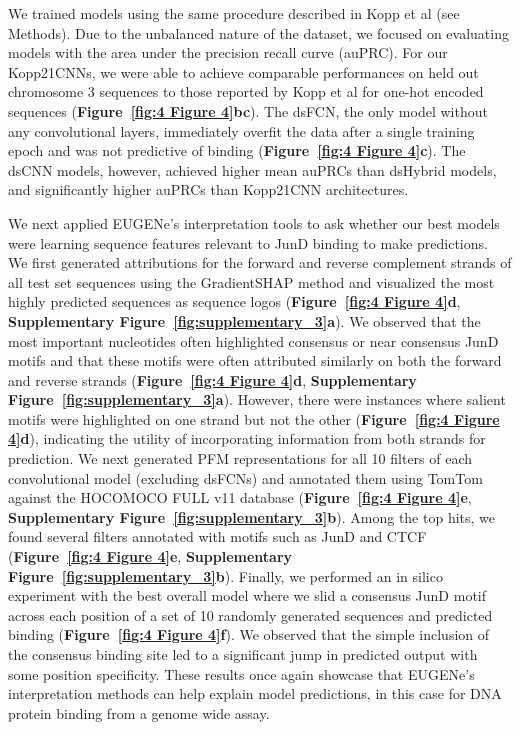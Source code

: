 We trained models using the same procedure described in Kopp et al (see Methods)\cite{Kopp2020-fw}. Due to the unbalanced nature of the dataset, we focused on evaluating models with the area under the precision recall curve (auPRC). For our Kopp21CNNs, we were able to achieve comparable performances on held out chromosome 3 sequences to those reported by Kopp et al for one-hot encoded sequences (\textbf{Figure~\ref{fig:4 Figure 4}b}\textbf{c}). The dsFCN, the only model without any convolutional layers, immediately overfit the data after a single training epoch and was not predictive of binding (\textbf{Figure~\ref{fig:4 Figure 4}c}). The dsCNN models, however, achieved higher mean auPRCs than dsHybrid models, and significantly higher auPRCs than Kopp21CNN architectures.

We next applied EUGENe’s interpretation tools to ask whether our best models were learning sequence features relevant to JunD binding to make predictions. We first generated attributions for the forward and reverse complement strands of all test set sequences using the GradientSHAP\cite{Lundberg2017-hh} method and visualized the most highly predicted sequences as sequence logos (\textbf{Figure~\ref{fig:4 Figure 4}d}, \textbf{Supplementary Figure~\ref{fig:supplementary_3}a}). We observed that the most important nucleotides often highlighted consensus or near consensus JunD motifs and that these motifs were often attributed similarly on both the forward and reverse strands (\textbf{Figure~\ref{fig:4 Figure 4}d}, \textbf{Supplementary Figure~\ref{fig:supplementary_3}a}). However, there were instances where salient motifs were highlighted on one strand but not the other (\textbf{Figure~\ref{fig:4 Figure 4}d}), indicating the utility of incorporating information from both strands for prediction. We next generated PFM representations for all 10 filters of each convolutional model (excluding dsFCNs) and annotated them using TomTom against the HOCOMOCO FULL v11 database\cite{Kulakovskiy2018-oz} (\textbf{Figure~\ref{fig:4 Figure 4}e}, \textbf{Supplementary Figure~\ref{fig:supplementary_3}b}). Among the top hits, we found several filters annotated with motifs such as JunD and CTCF (\textbf{Figure~\ref{fig:4 Figure 4}e}, \textbf{Supplementary Figure~\ref{fig:supplementary_3}b}). Finally, we performed an in silico experiment with the best overall model where we slid a consensus JunD motif across each position of a set of 10 randomly generated sequences and predicted binding (\textbf{Figure~\ref{fig:4 Figure 4}f}). We observed that the simple inclusion of the consensus binding site led to a significant jump in predicted output with some position specificity. These results once again showcase that EUGENe’s interpretation methods can help explain model predictions, in this case for DNA protein binding from a genome wide assay.

